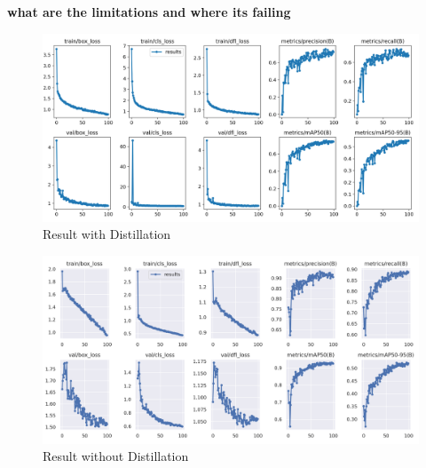 \begin{enumerate}
\begin{enumerate}
\end{enumerate}
\textbf{what are the limitations and where its failing}


\begin{figure}[H]
\centering
	\includegraphics*[width = 14cm]{images/loss-function-distillation.png}
	 \caption{Result with Distillation}
	\label{fig:r1}
\end{figure}

\begin{figure}[H]
\centering
	\includegraphics*[width = 14cm]{images/loss-function-without-distillation.png}
	 \caption{Result without Distillation}
	\label{fig:r2}
\end{figure}





% 



% 

\end{enumerate}
